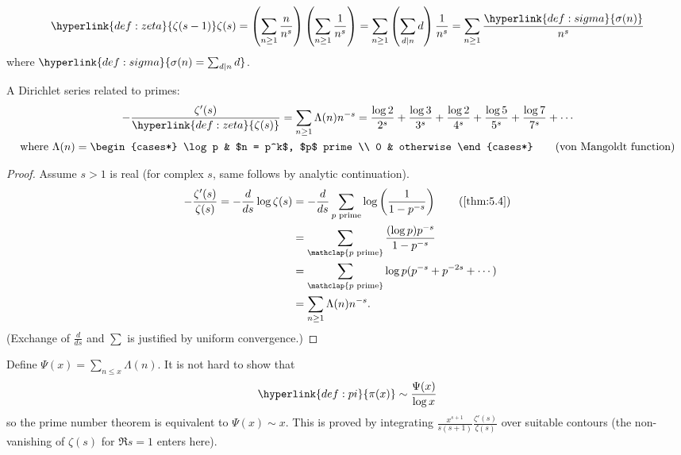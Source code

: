 \documentclass{article}
\newenvironment{manual}[1]{%
    \renewcommand\themanualinner{#1}%
    \manualinner
}{\endmanualinner}
\begin{document}
\begin{eg}
    \begin{equation*}
        \hyperlink{def:zeta}{\zeta(s-1)} \zeta(s) = \left(\sum_{n \geq 1} \frac{n}{n^s}\right)\left(\sum_{n \geq 1} \frac{1}{n^s}\right) = \sum_{n \geq 1} \left(\sum_{d \mid n} d\right) \frac{1}{n^s} = \sum_{n \geq 1} \frac{\hyperlink{def:sigma}{\sigma(n)}}{n^s}
    \end{equation*}
    where $\hyperlink{def:sigma}{\sigma(n) = \sum_{d \mid n} d}$.
\end{eg}

A Dirichlet series related to primes:
\begin{manual}{Theorem 5.5a}\label{thm:5.5a}
    \begin{gather*}
        -\frac{\zeta'(s)}{\hyperlink{def:zeta}{\zeta(s)}} = \sum_{n \geq 1} \Lambda(n) n^{-s} = \frac{\log 2}{2^s} + \frac{\log 3}{3^s} + \frac{\log 2}{4^s} + \frac{\log 5}{5^s} + \frac{\log 7}{7^s} + \dotsb \\
        \text{where } \Lambda(n) =
        \begin{cases*}
            \log p & $n = p^k$, $p$ prime \\
            0 & otherwise
        \end{cases*}
        \tag{von Mangoldt function}
    \end{gather*}
\end{manual}

\begin{proof}
    Assume $s > 1$ is real (for complex $s$, same follows by analytic continuation).
    \begin{align*}
        -\frac{\zeta'(s)}{\zeta(s)} = - \frac{d}{ds} \log \zeta(s) &= - \frac{d}{ds} \sum_{p \text{ prime}} \log\left(\frac{1}{1 - p^{-s}}\right) \tag{\Cref{thm:5.4}} \\
                                                                   &= \sum_{\mathclap{p \text{ prime}}} \frac{(\log p) p^{-s}} {1 - p^{-s}} \\
                                                                   &= \sum_{\mathclap{p \text{ prime}}} \log p (p^{-s} + p^{-2s} + \dotsb) \\
                                                                   &= \sum_{n \geq 1} \Lambda(n) n^{-s}.
    \end{align*}
    (Exchange of $\frac{d}{ds}$ and $\sum$ is justified by uniform convergence.)
\end{proof}

Define $\Psi(x) = \sum_{n \leq x} \Lambda(n)$.
It is not hard to show that
\begin{equation*}
    \hyperlink{def:pi}{\pi(x)} \sim \frac{\Psi(x)}{\log x}
\end{equation*}
so the prime number theorem is equivalent to $\Psi(x) \sim x$.
This is proved by integrating $\frac{x^{s+1}}{s(s+1)} \frac{\zeta'(s)}{\zeta(s)}$ over suitable contours (the non-vanishing of $\zeta(s)$ for $\Re s = 1$ enters here).
\end{document}
